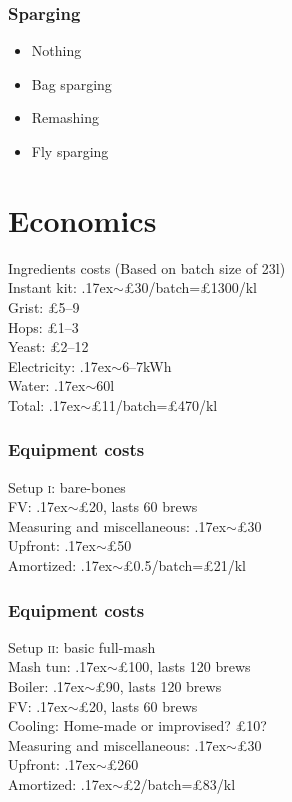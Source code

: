 \documentclass{beamer}
\newcommand{\like}{\raise.17ex\hbox{$\scriptstyle\sim$}}
\begin{document}
\begin{frame}
  \frametitle{Sparging}
  \begin{itemize}
  \item Nothing
  \item Bag sparging
  \item Remashing
  \item Fly sparging
  \end{itemize}
  
\end{frame}


\section{Economics}

\begin{frame}{Ingredients costs}
  (Based on batch size of 23l)\\
  Instant kit: \like £30/batch=£1300/kl\\\bigskip
   Grist: £5--9\\
  Hops: £1--3\\
  Yeast: £2--12\\
   Electricity: \like 6--7kWh\\
  Water: \like 60l\\
   Total: \like £11/batch=£470/kl
\end{frame}

\begin{frame}
  \frametitle{Equipment costs}
  Setup \textsc{i}: bare-bones\\
  FV: \like £20, lasts 60 brews\\
   Measuring and miscellaneous: \like £30\\
   Upfront: \like £50\\
   Amortized: \like £0.5/batch=£21/kl
\end{frame}

\begin{frame}
  \frametitle{Equipment costs}
  Setup \textsc{ii}: basic full-mash\\
   Mash tun: \like £100, lasts 120 brews\\
   Boiler: \like £90, lasts 120 brews\\
   FV: \like £20, lasts 60 brews\\
   Cooling: Home-made or improvised? £10?\\
   Measuring and miscellaneous: \like £30\\
   Upfront: \like £260\\
   Amortized: \like £2/batch=£83/kl
\end{frame}
\end{document}
